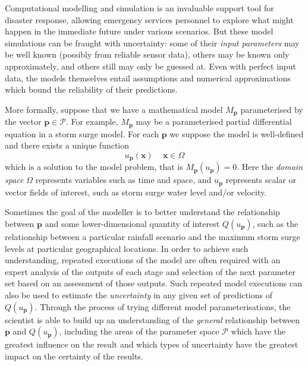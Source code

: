 \documentclass[a4paper,fontsize=12pt]{scrartcl}
\begin{document}
Computational modelling and simulation is an invaluable support tool
for disaster response, allowing emergency services personnel to
explore what might happen in the immediate future under various
scenarios. But these model simulations can be fraught with
uncertainty: some of their \emph{input parameters} may be well known
(possibly from reliable sensor data), others may be known only
approximately, and others still may only be guessed at. Even with
perfect input data, the models themselves entail assumptions and
numerical approximations which bound the reliability of their
predictions.

More formally, suppose that we have a mathematical model
$M_{\mathbf{p}}$ parameterised by the vector
$\mathbf{p}\in\mathcal{P}$. For example, $M_{\mathbf{p}}$ may be a
parameterised partial differential equation %
in a storm surge model. For each $\mathbf{p}$ we suppose the model is
well-defined and there exists a unique function
\begin{equation}
  \label{eq:1}
  u_{\mathbf{p}}(\mathbf{x})\, \quad \mathbf{x}\in\Omega
\end{equation}
which is a solution to the model problem, that is $M_{\mathbf{p}}(u_{\mathbf{p}})=0$.
Here the \emph{domain space} $\Omega$ represents variables such as 
time and space, 
and $u_{\mathbf{p}}$ represents scalar or vector fields of interest, 
such as storm surge water level and/or velocity.    

Sometimes the goal of the modeller is to better understand the
relationship between $\mathbf{p}$ and some lower-dimensional quantity
of interest $Q(u_{\mathbf{p}})$, such as the relationship between a
particular rainfall scenario and the maximum storm surge levels at
particular geographical locations. In order to achieve such
understanding, repeated executions of the model are often required
with an expert analysis of the outputs of each stage and selection of
the next parameter set based on an assessment of those outputs. Such
repeated model executions can also be used to estimate the
\emph{uncertainty} in any given set of predictions of
$Q(u_{\mathbf{p}})$. Through the process of trying different model
parameterisations, the scientist is able to build up an understanding
of the \emph{general} relationship between $\mathbf{p}$ and
$Q(u_{\mathbf{p}})$, including the areas of the parameter space
$\mathcal{P}$ which have the greatest influence on the result and
which types of uncertainty have the greatest impact on the certainty
of the results.
\end{document}
